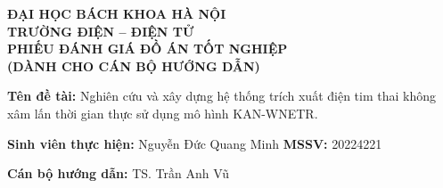 \documentclass[DoAn.tex]{subfiles}
\begin{document}
\thispagestyle{empty}
\setlength{\parindent}{0pt}
\singlespacing
\raggedbottom

\begin{center}
  {\textbf{ĐẠI HỌC BÁCH KHOA HÀ NỘI}}\\
  {\textbf{TRƯỜNG ĐIỆN -- ĐIỆN TỬ}}\\[0.4cm]
  {\large\textbf{PHIẾU ĐÁNH GIÁ ĐỒ ÁN TỐT NGHIỆP}}\\[0.15cm]
  {\textbf{(DÀNH CHO CÁN BỘ HƯỚNG DẪN)}}
\end{center}

\vspace{-0.2cm}

\noindent
\textbf{Tên đề tài:} Nghiên cứu và xây dựng hệ thống trích xuất điện tim thai không xâm lấn thời gian thực sử dụng mô hình KAN-WNETR.\par
\vspace{0.05cm}
\noindent\textbf{Sinh viên thực hiện:} Nguyễn Đức Quang Minh \hfill \textbf{MSSV:} 20224221\par
\vspace{0.05cm}
\noindent\textbf{Cán bộ hướng dẫn:} TS. Trần Anh Vũ\par
\vspace{-0.5cm}
\end{document}
